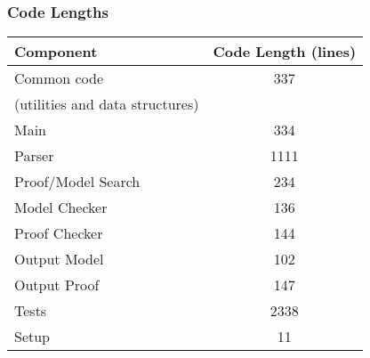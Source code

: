 \begin{frame}
  \frametitle{Code Lengths}
\begin{center}
  \begin{tabular}{|l|c|}
\hline
\textbf{Component} & \textbf{Code Length (lines)} \\
\hline
Common code & 337\\
(utilities and data structures) & \\
\hline
Main & 334\\
\hline
Parser & 1111\\
\hline
Proof/Model Search & 234\\
\hline
Model Checker & 136\\
\hline
Proof Checker & 144\\
\hline
Output Model & 102\\
\hline
Output Proof & 147\\
\hline
Tests & 2338\\
\hline
Setup & 11\\
\hline
\end{tabular}
\end{center}
\end{frame}